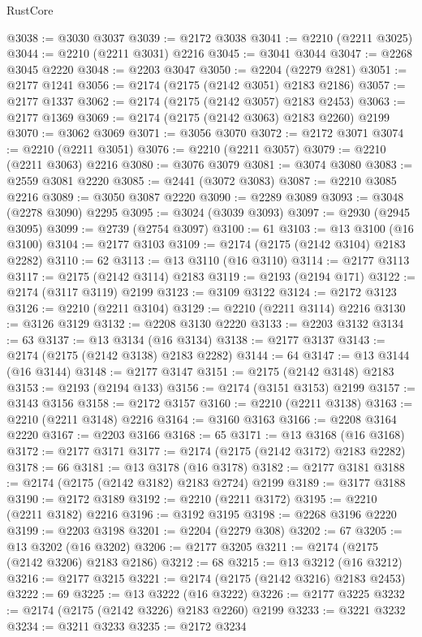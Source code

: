 \begin{lexlean}{RustCore}
\begin{coremodule}
@3038 := @3030 @3037
@3039 := @2172 @3038
@3041 := @2210 (@2211 @3025)
@3044 := @2210 (@2211 @3031) @2216
@3045 := @3041 @3044
@3047 := @2268 @3045 @2220
@3048 := @2203 @3047
@3050 := @2204 (@2279 @281)
@3051 := @2177 @1241
@3056 := @2174 (@2175 (@2142 @3051) @2183 @2186)
@3057 := @2177 @1337
@3062 := @2174 (@2175 (@2142 @3057) @2183 @2453)
@3063 := @2177 @1369
@3069 := @2174 (@2175 (@2142 @3063) @2183 @2260) @2199
@3070 := @3062 @3069
@3071 := @3056 @3070
@3072 := @2172 @3071
@3074 := @2210 (@2211 @3051)
@3076 := @2210 (@2211 @3057)
@3079 := @2210 (@2211 @3063) @2216
@3080 := @3076 @3079
@3081 := @3074 @3080
@3083 := @2559 @3081 @2220
@3085 := @2441 (@3072 @3083)
@3087 := @2210 @3085 @2216
@3089 := @3050 @3087 @2220
@3090 := @2289 @3089
@3093 := @3048 (@2278 @3090) @2295
@3095 := @3024 (@3039 @3093)
@3097 := @2930 (@2945 @3095)
@3099 := @2739 (@2754 @3097)
@3100 := 61
@3103 := @13 @3100 (@16 @3100)
@3104 := @2177 @3103
@3109 := @2174 (@2175 (@2142 @3104) @2183 @2282)
@3110 := 62
@3113 := @13 @3110 (@16 @3110)
@3114 := @2177 @3113
@3117 := @2175 (@2142 @3114) @2183
@3119 := @2193 (@2194 @171)
@3122 := @2174 (@3117 @3119) @2199
@3123 := @3109 @3122
@3124 := @2172 @3123
@3126 := @2210 (@2211 @3104)
@3129 := @2210 (@2211 @3114) @2216
@3130 := @3126 @3129
@3132 := @2208 @3130 @2220
@3133 := @2203 @3132
@3134 := 63
@3137 := @13 @3134 (@16 @3134)
@3138 := @2177 @3137
@3143 := @2174 (@2175 (@2142 @3138) @2183 @2282)
@3144 := 64
@3147 := @13 @3144 (@16 @3144)
@3148 := @2177 @3147
@3151 := @2175 (@2142 @3148) @2183
@3153 := @2193 (@2194 @133)
@3156 := @2174 (@3151 @3153) @2199
@3157 := @3143 @3156
@3158 := @2172 @3157
@3160 := @2210 (@2211 @3138)
@3163 := @2210 (@2211 @3148) @2216
@3164 := @3160 @3163
@3166 := @2208 @3164 @2220
@3167 := @2203 @3166
@3168 := 65
@3171 := @13 @3168 (@16 @3168)
@3172 := @2177 @3171
@3177 := @2174 (@2175 (@2142 @3172) @2183 @2282)
@3178 := 66
@3181 := @13 @3178 (@16 @3178)
@3182 := @2177 @3181
@3188 := @2174 (@2175 (@2142 @3182) @2183 @2724) @2199
@3189 := @3177 @3188
@3190 := @2172 @3189
@3192 := @2210 (@2211 @3172)
@3195 := @2210 (@2211 @3182) @2216
@3196 := @3192 @3195
@3198 := @2268 @3196 @2220
@3199 := @2203 @3198
@3201 := @2204 (@2279 @308)
@3202 := 67
@3205 := @13 @3202 (@16 @3202)
@3206 := @2177 @3205
@3211 := @2174 (@2175 (@2142 @3206) @2183 @2186)
@3212 := 68
@3215 := @13 @3212 (@16 @3212)
@3216 := @2177 @3215
@3221 := @2174 (@2175 (@2142 @3216) @2183 @2453)
@3222 := 69
@3225 := @13 @3222 (@16 @3222)
@3226 := @2177 @3225
@3232 := @2174 (@2175 (@2142 @3226) @2183 @2260) @2199
@3233 := @3221 @3232
@3234 := @3211 @3233
@3235 := @2172 @3234

\end{coremodule}
\end{lexlean}
